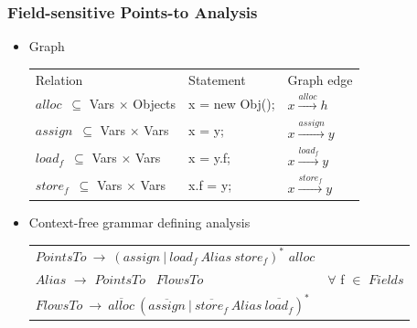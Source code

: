 \documentclass[x11names,dvipsnames,table]{beamer}
\begin{document}
\begin{frame}[fragile]
\transwipe[direction=90]
\frametitle{Field-sensitive Points-to Analysis}

\begin{itemize}
    \item Graph \\
    \begin{tabular}{lll}
        Relation & Statement & Graph edge \\
        $alloc$\ $\subseteq$ Vars $\times$ Objects & x = new Obj(); & $x \xrightarrow{alloc} h$ \\
        $assign$\ $\subseteq$ Vars $\times$ Vars & x = y; & $x \xrightarrow{assign} y$ \\
        $load_f$\ $\subseteq$ Vars $\times$ Vars & x = y.f; & $x \xrightarrow{load_f} y$ \\
        $store_f$\ $\subseteq$ Vars $\times$ Vars & x.f = y; & $x \xrightarrow{store_f} y$ \\
    \end{tabular}

    \item Context-free grammar defining analysis \\
    \begin{tabular}{ll}
        $PointsTo\ \to\ (assign\ |\ load_f\ Alias\ store_f)^*$ $alloc$ & \\
        $Alias$ $\to$ $PointsTo$ \ $FlowsTo$ & $\forall$ f $\in$ $Fields$ \\
        $FlowsTo\ \to\ \overline{alloc}\ (\overline{assign}\ |\ \overline{store_f}\ Alias\ \overline{load_f})^*$ & \\
    \end{tabular}

\end{itemize}

\end{frame}
\end{document}
